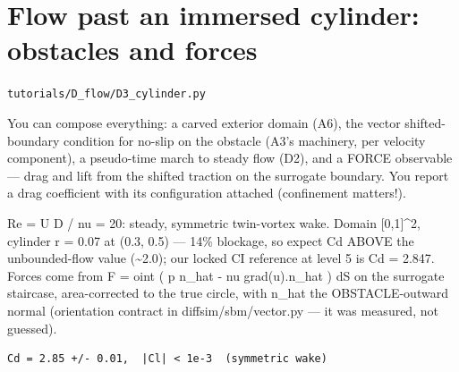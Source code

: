 \chapter{Flow past an immersed cylinder: obstacles and forces}
\label{ch:D3_cylinder}
\noindent\texttt{tutorials/D\_flow/D3\_cylinder.py}\\[0.75em]
\begin{outcome}
You can compose everything: a carved exterior domain
(A6), the vector shifted-boundary condition for no-slip on the obstacle
(A3's machinery, per velocity component), a pseudo-time march to steady
flow (D2), and a FORCE observable — drag and lift from the shifted
traction on the surrogate boundary. You report a drag coefficient with
its configuration attached (confinement matters!).
\end{outcome}

Re = U D / nu = 20: steady, symmetric twin-vortex wake.
Domain [0,1]\textasciicircum{}2, cylinder r = 0.07 at (0.3, 0.5) — 14\% blockage, so expect
Cd ABOVE the unbounded-flow value (\textasciitilde{}2.0); our locked CI reference at
level 5 is Cd = 2.847. Forces come from
    F = oint ( p n\_hat - nu grad(u).n\_hat ) dS
on the surrogate staircase, area-corrected to the true circle, with
n\_hat the OBSTACLE-outward normal (orientation contract in
diffsim/sbm/vector.py — it was measured, not guessed).

\begin{expected}
\begin{verbatim}
Cd = 2.85 +/- 0.01,  |Cl| < 1e-3  (symmetric wake)
\end{verbatim}
\end{expected}

